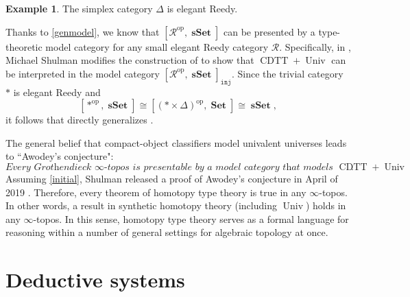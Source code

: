 \documentclass[10pt,letterpaper,cm]{nupset}
\theoremstyle{definition}
\newtheorem{exmp}[definition]{Example}
\theoremstyle{theorem}
\theoremstyle{remark}
\newcommand{\0}{\mathbf{0}}
\newcommand{\1}{\mathbf{1}}
\newcommand{\2}{\mathbf{2}}
\DeclareMathOperator{\cdtt}{\mathrm{CDTT}}
\DeclareMathOperator{\univ}{\mathrm{Univ}}
\DeclareMathOperator{\op}{op}
\DeclareMathOperator{\sset}{\mathbf{sSet}}
\DeclareMathOperator{\set}{\mathbf{Set}}
\newcommand{\rr}{\mathscr{R}}
\begin{document}
\begin{exmp}
The simplex category $\varDelta$ is elegant Reedy.
\end{exmp}

\smallskip

Thanks to \cref{genmodel}, we know that $\left[\rr^{\op}, \sset\right]$ can be presented by a type-theoretic model category for  any small elegant Reedy category $\rr$. Specifically, in \cite{Shul},  Michael Shulman modifies the construction of \cite{KL} to show that $\cdtt  +\univ$ can be interpreted in the model category  $\left[\rr^{\op}, \sset\right]_{\mathtt{inj}}$. Since the trivial category $\ast$ is elegant Reedy  and $$\left[\ast^{\op}, \sset\right] \cong \left[\left(\ast \times \varDelta\right)^{\op}, \set\right] \cong \sset,$$  it follows that \cite{Shul} directly generalizes \cite{KL}.

\medskip

The general belief that compact-object classifiers model univalent universes leads to  ``Awodey's conjecture":
\[
\textit{Every Grothendieck $\infty$-topos is presentable by a model category that models $\cdtt + \univ$}.
\] Assuming \cref{initial}, Shulman released a proof of Awodey's conjecture in April of 2019 {\autocite{Shul2}}.
Therefore, every theorem of homotopy type theory is true in any $\infty$-topos.  In other words, a result in synthetic homotopy theory (including $\univ$) holds in any $\infty$-topos. In this sense, homotopy type theory serves as a formal language for reasoning within a number of general settings for algebraic topology at once.

\newpage

\appendix

\section{Deductive systems}\label{natded}
\end{document}
